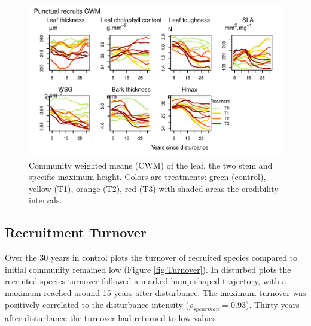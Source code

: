 \documentclass[fleqn,10pt]{ArtEcoFoG} %
\begin{document}
\begin{figure}

{\centering \includegraphics{RecruitmentTrajectories_files/figure-latex/CWM-1} 

}

\caption{Community weighted means (CWM) of the leaf, the two stem and specific maximum height. Colors are treatments: green (control), yellow (T1), orange (T2), red (T3) with shaded areas the credibility intervals.}\label{fig:CWM}
\end{figure}

\subsection{Recruitment Turnover}\label{recruitment-turnover}

Over the 30 years in control plots the turnover of recruited species
compared to initial community remained low (Figure \ref{fig:Turnover}).
In disturbed plots the recruited species turnover followed a marked
hump-shaped trajectory, with a maximum reached around 15 years after
disturbance. The maximum turnover was positively correlated to the
disturbance intensity (\(\rho_{spearman}=0.93\)). Thirty years after
disturbance the turnover had returned to low values.
\end{document}

